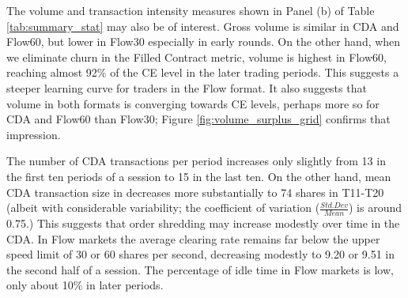 \documentclass[12pt]{article}
\begin{document}
The volume and transaction intensity measures shown in Panel (b) of Table \ref{tab:summary_stat} may also be of interest.
Gross volume is similar in CDA and Flow60, but lower in Flow30
especially in early rounds.
On the other hand, when we eliminate churn in the Filled Contract metric, volume is highest in Flow60, reaching almost 92\% of the CE level in the later trading periods.  
This suggests a steeper learning curve for traders in the Flow format. %
It also suggests that volume in both formats is converging towards CE levels, perhaps more so for CDA and Flow60 than Flow30; 
Figure \ref{fig:volume_surplus_grid}
confirms that impression.

The number of CDA transactions per period increases only slightly from 13 in the first ten periods of a session to 15 in the last ten. On the other hand, mean CDA transaction size in decreases more substantially to 74 shares in T11-T20 (albeit with considerable variability; the coefficient of variation ($\frac{Std. Dev}{Mean}$) is around 0.75.) 
This suggests that order shredding may increase modestly
over time in the CDA.
In Flow markets the average clearing rate remains far below the upper speed limit of 30 or 60 shares per second, decreasing modestly to 9.20 or 9.51 in the second half of a session. 
The percentage of idle time in Flow markets %
is low, only about 10\% in later periods. 
\end{document}
